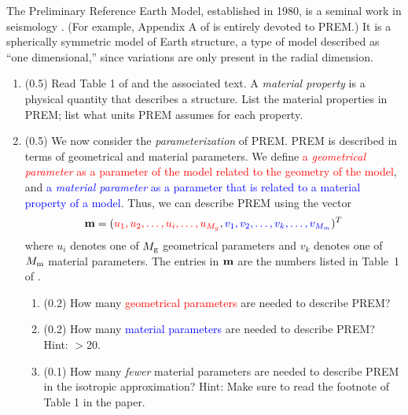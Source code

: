 \documentclass[11pt,titlepage,fleqn]{article}
\begin{document}
The Preliminary Reference Earth Model, established in 1980, is a seminal work in seismology \citep{PREM}. (For example, Appendix A of \citet{ShearerE2} is entirely devoted to PREM.) It is a spherically symmetric model of Earth structure, a type of model described as ``one dimensional,'' since variations are only present in the radial dimension.

\begin{enumerate}

\item (0.5) Read Table 1 of \citet{PREM} and the associated text. A {\em material property} is a physical quantity that describes a structure. List the material properties in PREM; list what units PREM assumes for each property.


\item (0.5) We now consider the {\em parameterization} of PREM. PREM is described in terms of geometrical and material parameters.
We define \textcolor{red}{a {\em geometrical parameter} as a parameter of the model related to the geometry of the model},
and \textcolor{blue}{a {\em material parameter} as a parameter that is related to a material property of a model}.
Thus, we can describe PREM using the vector
%
\begin{equation}
\mbox{${\bf m}$} = (\textcolor{red}{u_1, u_2, \ldots, u_i, \ldots, u_{M_g}},
\textcolor{blue}{v_1, v_2, \ldots, v_k, \ldots, v_{M_m}})^T
\label{bem}
\end{equation}
%
where $u_i$ denotes one of $M_{\rm g}$ geometrical parameters and $v_k$ denotes one of $M_{\rm m}$ material parameters.
The entries in $\mbox{${\bf m}$}$ are the numbers listed in Table~1 of \citet{PREM}.

\begin{enumerate}
\item (0.2) How many \textcolor{red}{geometrical parameters} are needed to describe PREM?
\item (0.2) How many \textcolor{blue}{material parameters} are needed to describe PREM? Hint: $>$20.
\item (0.1) How many {\em fewer} material parameters are needed to describe PREM in the isotropic approximation? Hint: Make sure to read the footnote of Table 1 in the paper.
\end{enumerate}




\end{enumerate}
\end{document}
